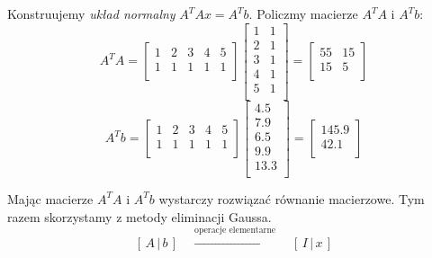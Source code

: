 \documentclass[a4paper,12pt]{article}
\begin{document}
Konstruujemy \emph{układ normalny} \(A^T Ax = A^T b\). Policzmy macierze \(A^T A\) i \(A^T b\):
\[
	A^T A = 
	\begin{bmatrix}
		1 & 2 & 3 & 4 &  5 \\
		1 & 1 & 1 & 1 &  1 \\
	\end{bmatrix}
	\begin{bmatrix}
		1 &  1 \\
		2 &  1 \\
		3 &  1 \\
		4 &  1 \\
		5 &  1 \\
	\end{bmatrix}
	=
	\begin{bmatrix}
		55 &  15 \\
		15 &  5 \\
	\end{bmatrix}
\]
\[
	A^T b = 
	\begin{bmatrix}
		1 & 2 & 3 & 4 &  5 \\
		1 & 1 & 1 & 1 &  1 \\
	\end{bmatrix}
	\begin{bmatrix}
		4.5 \\
		7.9 \\
		6.5 \\
		9.9 \\
		13.3 \\
   \end{bmatrix}
   = 
   \begin{bmatrix}
	 145.9 \\
	 42.1 \\
   \end{bmatrix}
\]

Mając macierze \(A^T A\) i \(A^T b\) wystarczy rozwiązać równanie macierzowe. Tym razem skorzystamy z metody eliminacji Gaussa.
\[
	[\,A\,|\,b\,]
	\quad
	\overset{\text{operacje elementarne}}{\xrightarrow{\hspace{3cm}}}
	\quad
	[\,I\,|\,x\,]
\]

\newpage
\end{document}
